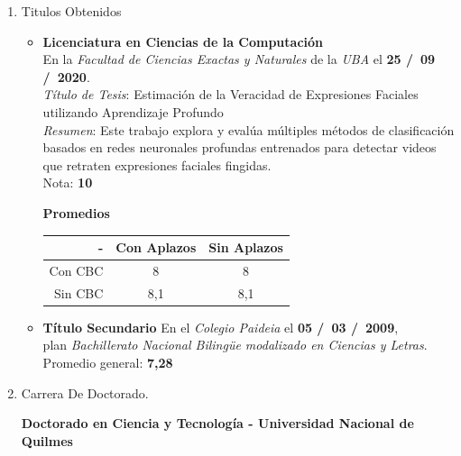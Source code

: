 \begin{enumerate}[leftmargin=0.8cm]

  \item[a)]{Titulos Obtenidos

    \begin{itemize}[leftmargin=0.2cm]

      \item {
        \textbf{Licenciatura en Ciencias de la Computación} \\
        En la \emph{Facultad de Ciencias Exactas y Naturales} de la \emph{UBA} el \textbf{25 \slash \ 09 \slash \ 2020}.
        \\ \emph{Título de Tesis}: Estimación de la Veracidad de Expresiones Faciales utilizando Aprendizaje Profundo
        \\ \emph{Resumen}: Este trabajo explora y evalúa múltiples métodos de clasificación basados en redes neuronales profundas entrenados para detectar videos que retraten expresiones faciales fingidas. \\
        Nota: \textbf{10}
        \ifdefined\JTP
        \begin{center}
        \textbf{Promedios}

        \begin{tabular}{|r|c|c|}
        \hline
        - & Con Aplazos & Sin Aplazos \\
        \hline
        Con CBC & 8 & 8 \\
        \hline
        Sin CBC & 8,1 & 8,1 \\
        \hline
        \end{tabular}
        \end{center}
        \fi
      }

      \item {
        \textbf{Título Secundario}
        En el \emph{Colegio Paideia} el \textbf{05 \slash \ 03 \slash \ 2009}, \\
        plan \emph{Bachillerato Nacional Bilingüe modalizado en Ciencias y Letras}. \\
        Promedio general: \textbf{7,28}
      }

    \end{itemize}

  }

  \item[b)]{Carrera De Doctorado.

    \textbf{Doctorado en Ciencia y Tecnología - Universidad Nacional de Quilmes}

}
\end{enumerate}
